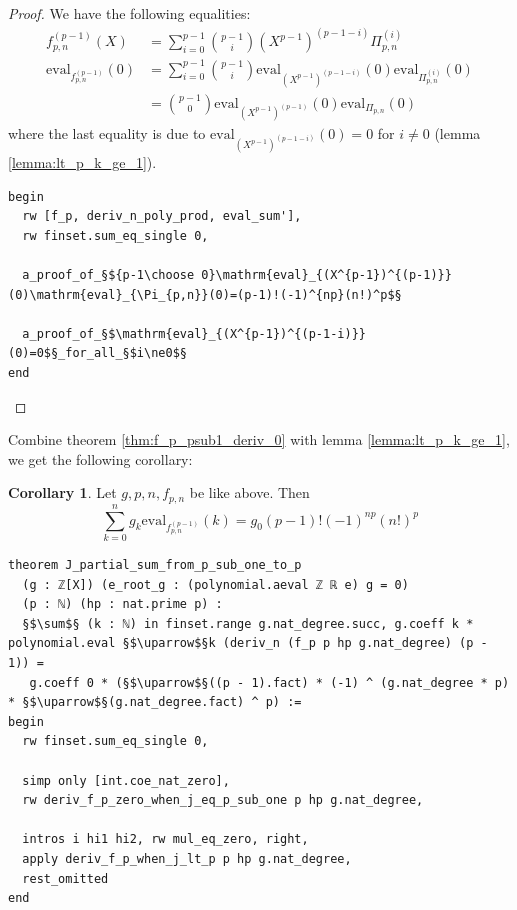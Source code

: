 \documentclass{report}
\theoremstyle{definition}
\newtheorem{corollary}{Corollary}[section]
\begin{document}
\begin{proof}
We have the following equalities:
\begin{equation*}
\begin{aligned}
f_{p,n}^{(p-1)}(X)&=\sum_{i=0}^{p-1}{p-1\choose i}(X^{p-1})^{(p-1-i)}\Pi_{p,n}^{(i)} \\
\mathrm{eval}_{f_{p,n}^{(p-1)}}(0)&=\sum_{i=0}^{p-1}{p-1\choose i}\mathrm{eval}_{(X^{p-1})^{(p-1-i)}}(0)\mathrm{eval}_{\Pi_{p,n}^{(i)}}(0)\\
&={p-1\choose 0}\mathrm{eval}_{(X^{p-1})^{(p-1)}}(0)\mathrm{eval}_{\Pi_{p,n}}(0)
\end{aligned}
\end{equation*}
where the last equality is due to $\mathrm{eval}_{(X^{p-1})^{(p-1-i)}}(0)=0$ for $i\ne 0$ (lemma \ref{lemma:lt_p_k_ge_1}).
\begin{verbatim}
begin
  rw [f_p, deriv_n_poly_prod, eval_sum'],
  rw finset.sum_eq_single 0,

  a_proof_of_§${p-1\choose 0}\mathrm{eval}_{(X^{p-1})^{(p-1)}}(0)\mathrm{eval}_{\Pi_{p,n}}(0)=(p-1)!(-1)^{np}(n!)^p$§

  a_proof_of_§$\mathrm{eval}_{(X^{p-1})^{(p-1-i)}}(0)=0$§_for_all_§$i\ne0$§
end
\end{verbatim}
\end{proof}

Combine theorem \ref{thm:f_p_psub1_deriv_0} with lemma \ref{lemma:lt_p_k_ge_1}, we get the following corollary:
\begin{corollary}\label{cor:part2}
Let $g,p,n,f_{p,n}$ be like above. Then 
$$
\sum_{k=0}^n g_k \mathrm{eval}_{f_{p,n}^{(p-1)}}(k)=g_0 (p-1)! (-1)^{np} (n!)^p
$$

\begin{verbatim}
theorem J_partial_sum_from_p_sub_one_to_p
  (g : ℤ[X]) (e_root_g : (polynomial.aeval ℤ ℝ e) g = 0)
  (p : ℕ) (hp : nat.prime p) :
  §$\sum$§ (k : ℕ) in finset.range g.nat_degree.succ, g.coeff k * polynomial.eval §$\uparrow$§k (deriv_n (f_p p hp g.nat_degree) (p - 1)) = 
   g.coeff 0 * (§$\uparrow$§((p - 1).fact) * (-1) ^ (g.nat_degree * p) * §$\uparrow$§(g.nat_degree.fact) ^ p) :=
begin
  rw finset.sum_eq_single 0,

  simp only [int.coe_nat_zero],
  rw deriv_f_p_zero_when_j_eq_p_sub_one p hp g.nat_degree,

  intros i hi1 hi2, rw mul_eq_zero, right,
  apply deriv_f_p_when_j_lt_p p hp g.nat_degree,
  rest_omitted
end
\end{verbatim}
\end{corollary}
\end{document}
